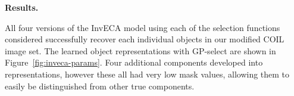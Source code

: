 \documentclass[12pt]{article}
\begin{document}
\textbf{Results.}
%
\begin{figure*}[t!]
\centering
\caption{Image components and their masks learned by GP-select with the Translation Invariant model. GP-select learned all objects in the dataset.
The first row shows the mask of each component, 
the second row shows the learned image components,  
and the third row shows only the area of the learned components that had a mask $>0.5$.
}
\label{fig:inveca-params}
\end{figure*}
%
All four versions of the InvECA model using each of the selection functions considered successfully recover each individual objects in our modified COIL image set. 
The learned object representations with GP-select are shown in Figure~\ref{fig:inveca-params}.
Four additional components developed into representations, however these all had very low mask values, allowing them to easily be distinguished from other true components.
\end{document}
